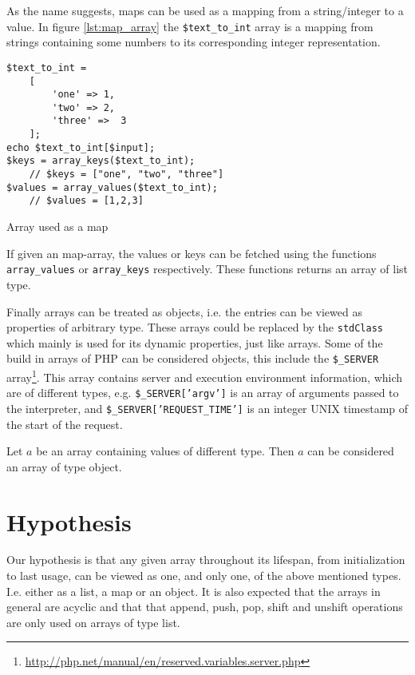 As the name suggests, maps can be used as a mapping from a string/integer to a value. In figure \ref{lst:map_array} the \texttt{\$text\_to\_int} array is a mapping from strings containing some numbers to its corresponding integer representation. 

\begin{program}[ht]
\begin{lstlisting}
$text_to_int = 
    [ 
        'one' => 1,
        'two' => 2,
        'three' =>  3
    ];
echo $text_to_int[$input]; 
$keys = array_keys($text_to_int);
    // $keys = ["one", "two", "three"]
$values = array_values($text_to_int);
    // $values = [1,2,3]
\end{lstlisting}
\caption{Array used as a map}
\label{lst:map_array}
\end{program}

If given an map-array, the values or keys can be fetched using the functions \texttt{array\_values} or \texttt{array\_keys} respectively. These functions returns an array of list type. 

Finally arrays can be treated as objects, i.e. the entries can be viewed as properties of arbitrary type. These arrays could be replaced by the \texttt{stdClass} which mainly is used for its dynamic properties, just like arrays. Some of the build in arrays of PHP can be considered objects, this include the \texttt{\$\_SERVER} array\footnote{\url{http://php.net/manual/en/reserved.variables.server.php}}. This array contains server and execution environment information, which are of different types, e.g. \texttt{\$\_SERVER['argv']} is an array of arguments passed to the interpreter, and \texttt{\$\_SERVER['REQUEST\_TIME']} is an integer UNIX timestamp of the start of the request. 

\begin{definition}
Let $a$ be an array containing values of different type. Then $a$ can be considered an array of type object.
\end{definition}


\section{Hypothesis}
\label{sec:dynhypothesis}
Our hypothesis is that any given array throughout its lifespan, from initialization to last usage, can be viewed as one, and only one, of the above mentioned types. I.e. either as a list, a map or an object. It is also expected that the arrays in general are acyclic and that that append, push, pop, shift and unshift operations are only used on arrays of type list.

